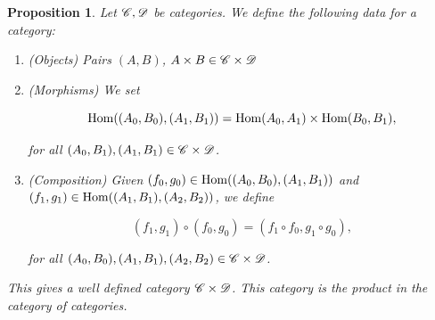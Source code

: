 \documentclass{article}
\newtheorem{proposition}{Proposition}[section]
\theoremstyle{definition}
\numberwithin{figure}{section}
\begin{document}
\begin{proposition} Let $\mathscr{C},\mathscr{D}$ be categories. We define the following data for a category:

\begin{enumerate}
\item (Objects) Pairs $(A,B)$, $A\times B\in \mathscr{C}\times \mathscr{D}$
\item (Morphisms) We set

$$\mathrm{Hom}((A_0,B_0),(A_1,B_1))=\mathrm{Hom}(A_0,A_1)\times \mathrm{Hom}(B_0,B_1),$$

for all $(A_0,B_1), (A_1,B_1)\in \mathscr{C}\times \mathscr{D}$.
\item (Composition) Given $(f_0,g_0)\in \mathrm{Hom}((A_0,B_0),(A_1,B_1))$ and $(f_1,g_1)\in \mathrm{Hom}((A_1,B_1),(A_2,B_2))$, we define

$$(f_1,g_1)\circ (f_0,g_0)=(f_1\circ f_0, g_1\circ g_0),$$

for all $(A_0,B_0),(A_1,B_1),(A_2,B_2)\in \mathscr{C}\times \mathscr{D}$.
\end{enumerate}

This gives a well defined category $\mathscr{C}\times \mathscr{D}$. This category is the product in the category of categories.
\end{proposition}
\end{document}
